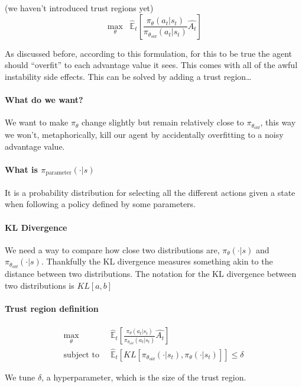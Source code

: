 \documentclass{article}
\begin{document}
(we haven't introduced trust regions yet)
\[
    \max_\theta \;\; \hat{\mathbb{E}}_{t} \left [ \frac{{\pi_\theta} (a_t|s_t)}{{\pi_{\theta_{old}}} (a_t|s_t)} \hat{A_t} \right]
\]

As discussed before, according to this formulation, for this to be true the agent should ``overfit'' to each advantage value it sees. This comes with all of the awful instability side effects. This can be solved by adding a trust region\dots

\paragraph{What do we want?} We want to make \( \pi_\theta \) change slightly but remain relatively close to \( \pi_{\theta_{old}} \), this way we won't, metaphorically, kill our agent by accidentally overfitting to a noisy advantage value.

\paragraph{What is \( \pi_{\text{parameter}}(\cdot | s) \)} It is a probability distribution for selecting all the different actions given a state when following a policy defined by some parameters.

\paragraph{KL Divergence} We need a way to compare how close two distributions are, \( \pi_\theta(\cdot | s) \) and \( \pi_{\theta_{old}}(\cdot | s) \). Thankfully the KL divergence measures something akin to the distance between two distributions. The notation for the KL divergence between two distributions is \(KL[a, b]\) 

\paragraph{Trust region definition}
\begin{align*}
    \max_\theta \;\; &\hat{\mathbb{E}}_{t} \left [ \frac{{\pi_\theta} (a_t|s_t)}{{\pi_{\theta_{old}}} (a_t|s_t)} \hat{A_t} \right] \\
    \text{subject to} \;\; &\hat{\mathbb{E}}_{t} \left [ KL \left[  \pi_{\theta_{old}} (\cdot|s_t), \pi_{\theta} (\cdot|s_t)\right] \right] \le \delta
\end{align*}

We tune \(\delta\), a hyperparameter, which is the size of the trust region.
\end{document}
